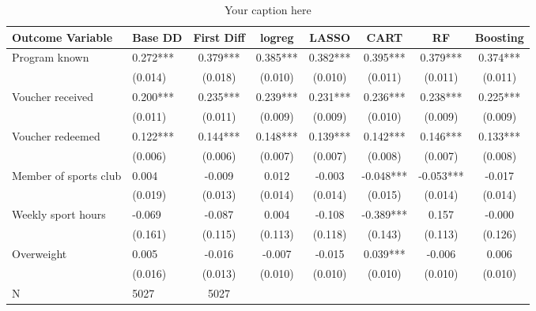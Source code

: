 \begin{sidewaystable*}
\centering
\begin{tabular}{llcccccc}
\hline
Outcome Variable & Base DD & First Diff & logreg & LASSO & CART & RF & Boosting \\
\hline
Program known & 0.272*** & 0.379*** & 0.385*** & 0.382*** & 0.395*** & 0.379*** & 0.374*** \\
  & (0.014) & (0.018) & (0.010) & (0.010) & (0.011) & (0.011) & (0.011) \\
Voucher received & 0.200*** & 0.235*** & 0.239*** & 0.231*** & 0.236*** & 0.238*** & 0.225*** \\
  & (0.011) & (0.011) & (0.009) & (0.009) & (0.010) & (0.009) & (0.009) \\
Voucher redeemed & 0.122*** & 0.144*** & 0.148*** & 0.139*** & 0.142*** & 0.146*** & 0.133*** \\
  & (0.006) & (0.006) & (0.007) & (0.007) & (0.008) & (0.007) & (0.008) \\
Member of sports club & 0.004 & -0.009 & 0.012 & -0.003 & -0.048*** & -0.053*** & -0.017 \\
  & (0.019) & (0.013) & (0.014) & (0.014) & (0.015) & (0.014) & (0.014) \\
Weekly sport hours & -0.069 & -0.087 & 0.004 & -0.108 & -0.389*** & 0.157 & -0.000 \\
  & (0.161) & (0.115) & (0.113) & (0.118) & (0.143) & (0.113) & (0.126) \\
Overweight & 0.005 & -0.016 & -0.007 & -0.015 & 0.039*** & -0.006 & 0.006 \\
  & (0.016) & (0.013) & (0.010) & (0.010) & (0.010) & (0.010) & (0.010) \\
\hline
N & 5027 & 5027  &  &  &  &  \\
\hline
\end{tabular}
\caption{Your caption here}
\label{tab:your_label}
\end{sidewaystable*}